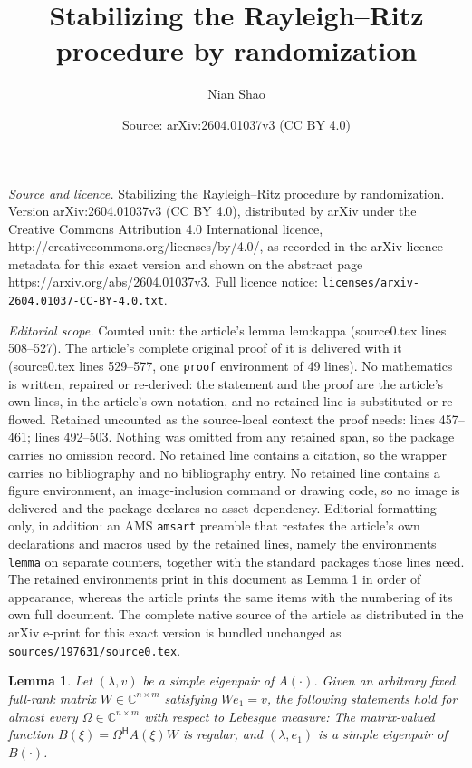 \documentclass[10pt,a4paper]{amsart}
\title{Stabilizing the Rayleigh--Ritz procedure by randomization}
\author{Nian Shao}
\date{Source: arXiv:2604.01037v3 (CC BY 4.0)}
\newtheorem{lemma}{Lemma}
\newcommand{\C}{\mathbb{C}}
\newcommand{\Htran}{\mathsf{H}}
\begin{document}
\maketitle

\noindent\emph{Source and licence.} Stabilizing the Rayleigh--Ritz procedure by randomization. Version arXiv:2604.01037v3 (CC BY 4.0), distributed by arXiv under the Creative Commons Attribution 4.0 International licence, http://creativecommons.org/licenses/by/4.0/, as recorded in the arXiv licence metadata for this exact version and shown on the abstract page https://arxiv.org/abs/2604.01037v3. Full licence notice: \texttt{licenses/arxiv-2604.01037-CC-BY-4.0.txt}.\par\smallskip

\noindent\textit{Editorial scope.} Counted unit: the article's lemma lem:kappa (source0.tex lines 508--527). The article's complete original proof of it is delivered with it (source0.tex lines 529--577, one \texttt{proof} environment of 49 lines). No mathematics is written, repaired or re-derived: the statement and the proof are the article's own lines, in the article's own notation, and no retained line is substituted or re-flowed.  Retained uncounted as the source-local context the proof needs: lines 457--461; lines 492--503.  Nothing was omitted from any retained span, so the package carries no omission record.  No retained line contains a citation, so the wrapper carries no bibliography and no bibliography entry.  No retained line contains a figure environment, an image-inclusion command or drawing code, so no image is delivered and the package declares no asset dependency.  Editorial formatting only, in addition: an AMS \texttt{amsart} preamble that restates the article's own declarations and macros used by the retained lines, namely the environments \texttt{lemma} on separate counters, together with the standard packages those lines need.  The retained environments print in this document as Lemma 1 in order of appearance, whereas the article prints the same items with the numbering of its own full document.  The complete native source of the article as distributed in the arXiv e-print for this exact version is bundled unchanged as \texttt{sources/197631/source0.tex}.
\begin{lemma}
    \label{lem:exact}
    Let $(\lambda,v)$ be a simple eigenpair of $A(\cdot)$.  Given an arbitrary fixed full-rank matrix $W\in\C^{n\times m}$ satisfying $We_{1}=v$, the following statements hold for almost every $\Omega\in\C^{n\times m}$ with respect to Lebesgue measure:
    The matrix-valued function $B(\xi)=\Omega^{\Htran}A(\xi)W$ is regular, and $(\lambda,e_{1})$ is a simple eigenpair of $B(\cdot)$.
\end{lemma}
\end{document}
